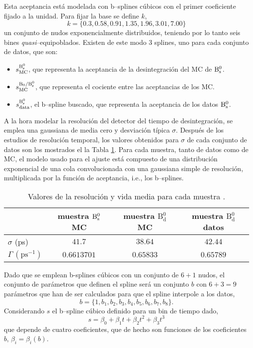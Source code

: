 Esta aceptancia está modelada con b--splines cúbicos con el primer coeficiente fijado a la unidad. Para fijar la base se define $k$,
\[k = \{0.3, 0.58, 0.91, 1.35, 1.96, 3.01,7.00\}\]
un conjunto de nudos exponencialmente distribuidos, teniendo por lo tanto seis bines \emph{quasi}--equipoblados. Existen de este modo $3$ splines, uno para cada conjunto de datos, que son:
\begin{itemize}
	\item $s_{\text{MC}}^{\text{B}{}_{\text{s}}^{\text{0}}}$, que representa la aceptancia de la desintegración del MC de $\text{B}{}_{\text{s}}^{\text{0}}$.
	\item $s_{\text{MC}}^{\mathrm{B_0}/\text{B}{}_{\text{s}}^{\text{0}}}$, que representa el cociente entre las aceptancias de los MC.
	\item $s_{\text{data}}^{\text{B}{}_{\text{s}}^{\text{0}}}$, el b--spline buscado, que representa la aceptancia de los datos $\text{B}{}_{\text{s}}^{\text{0}}$. 
\end{itemize}


A la hora modelar la resolución del detector del tiempo de desintegración, se emplea una gaussiana de media cero y desviación típica $\sigma$. Después de los estudios de resolución temporal, los valores obtenidos para $\sigma$ de cada conjunto de datos son los mostrados el la Tabla \ref{tab_dectimeacc}.
Para cada muestra, tanto de datos como de MC, el modelo usado para el ajuste está compuesto de una distribución exponencial de una cola convolucionada con una gaussiana simple de resolución, multiplicada por la función de aceptancia, i.e., los b--splines.

\begin{table}[H]
\centering
\begin{tabular}{lccc} \toprule
& muestra $\text{B}{}_{\text{s}}^{\text{0}}$ MC  & muestra $\text{B}{}_{\text{d}}^0$ MC  & muestra $\text{B}{}_{\text{d}}^0$ datos \\ \midrule
$\sigma$ (ps) & $41.7$ & $38.64$ & $42.44$ \\
$\Gamma \, \mathrm{(ps^{-1})}$ & $0.6613701$ & $0.65833$ & $0.65789$ \\
\bottomrule
\end{tabular}  
\caption{Valores de la resolución y vida media para cada muestra \cite{amhis2017averages}.} \label{tab_dectimeacc}
\end{table} 







Dado que se emplean b-splines cúbicos con un conjunto de $6+1$ nudos, el conjunto de parámetros que definen el spline será un conjunto $b$ con $6+3=9$ parámetros que han de ser calculados para que el spline interpole a los datos,
\begin{equation}
  b = \{1,b_1,b_2,b_3,b_4,b_5,b_6,b_7,b_8\}.
\end{equation} 
Considerando $s$ el b--spline cúbico definido para un bin de tiempo dado,
\begin{equation}
  s = \beta_0 + \beta_1 t + \beta_2 t^2 + \beta_3 t^3
\end{equation}
que depende de cuatro coeficientes, que de hecho son funciones de los coeficientes $b$, $\beta_i = \beta_i(b)$.

